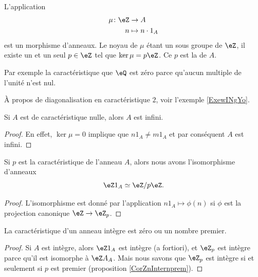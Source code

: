 L'application 
\begin{equation}
    \begin{aligned}
        \mu\colon \eZ&\to A \\
        n&\mapsto n\cdot 1_A 
    \end{aligned}
\end{equation}
est un morphisme d'anneaux. Le noyau de \( \mu\) étant un sous groupe de \( \eZ\), il existe un et un seul \( p\in\eZ\) tel que \( \ker\mu=p\eZ\). Ce \( p\) est la  de \( A\).

Par exemple la caractéristique que \( \eQ\) est zéro parce qu'aucun multiple de l'unité n'est nul.

À propos de diagonalisation en caractéristique \( 2\), voir l'exemple \ref{ExewINgYo}.

\begin{lemma}
    Si \( A\) est de caractéristique nulle, alors \( A\) est infini.
\end{lemma}

\begin{proof}
    En effet, \( \ker\mu=0\) implique que \( n1_A\neq  m1_A\) et par conséquent \( A\) est infini.
\end{proof}

\begin{lemma}       \label{LemHmDaYH}
    Si \( p\) est la caractéristique de l'anneau \( A\), alors nous avons l'isomorphisme d'anneaux
    \begin{equation}
         \eZ 1_A\simeq\eZ/p\eZ.
    \end{equation}
\end{lemma}

\begin{proof}
    L'isomorphisme est donné par l'application \( n1_A\mapsto \phi(n)\) si \( \phi\) est la projection canonique \( \eZ\to \eZ_p\).
\end{proof}

\begin{lemma}       \label{LemCaractIntergernbrcartpre}
    La caractéristique d'un anneau intègre est zéro ou un nombre premier.
\end{lemma}

\begin{proof}
    Si \( A\) est intègre, alors \( \eZ 1_A\) est intègre (a fortiori), et \( \eZ_p\) est intègre parce qu'il est isomorphe à \( \eZ A_A\). Mais nous savons que \( \eZ_p\) est intègre si et seulement si \( p\) est premier (proposition \ref{CorZnInternprem}).
\end{proof}

